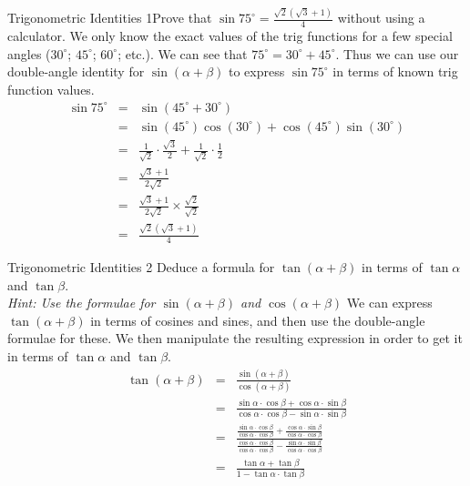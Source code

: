 \begin{wex}{Trigonometric Identities 1}{Prove that $\sin 75^\circ=\frac{\sqrt{2}(\sqrt{3}+1)}{4}$ without using a calculator.}
{
We only know the exact values of the trig functions for a few special angles ($30^\circ$; $45^\circ$; $60^\circ$; etc.). We can see that $75^\circ=30^\circ+45^\circ$. Thus we can use our double-angle identity for $\sin(\alpha+\beta)$ to express $\sin 75^\circ$ in terms of known trig function values.
\begin{eqnarray*}
\sin 75^\circ&=&\sin(45^\circ+30^\circ)\\
&=&\sin(45^\circ)\cos(30^\circ)+\cos(45^\circ)\sin(30^\circ)\\
&=&\frac{1}{\sqrt{2}}\cdot\frac{\sqrt{3}}{2}+\frac{1}{\sqrt{2}}\cdot\frac{1}{2}\\\
&=&\frac{\sqrt{3}+1}{2\sqrt{2}}\\
&=&\frac{\sqrt{3}+1}{2\sqrt{2}}\times\frac{\sqrt{2}}{\sqrt{2}}\\
&=&\frac{\sqrt{2}(\sqrt{3}+1)}{4}
\end{eqnarray*}
}
\end{wex}

\begin{wex}{Trigonometric Identities 2}
{Deduce a formula for $\tan(\alpha+\beta)$ in terms of $\tan\alpha$ and $\tan\beta$.\\
\emph{Hint: Use the formulae for $\sin(\alpha+\beta)$ and $\cos(\alpha+\beta)$} }
{
We can express $\tan(\alpha+\beta)$ in terms of cosines and sines, and then use the double-angle formulae for these. We then manipulate the resulting expression in order to get it in terms of $\tan\alpha$ and $\tan\beta$.
\westep{Execute strategy}
\begin{eqnarray*}
\tan(\alpha+\beta)&=&\frac{\sin(\alpha+\beta)}{\cos(\alpha+\beta)}\\
&=&\frac{\sin\alpha\cdot\cos\beta+\cos\alpha\cdot\sin\beta}{\cos\alpha\cdot\cos\beta-\sin\alpha\cdot\sin\beta}\\
&=&\frac{\frac{\sin\alpha\cdot\cos\beta}{\cos\alpha\cdot\cos\beta}+\frac{\cos\alpha\cdot\sin\beta}{\cos\alpha\cdot\cos\beta}}{\frac{\cos\alpha\cdot\cos\beta}{\cos\alpha\cdot\cos\beta}-\frac{\sin\alpha\cdot\sin\beta}{\cos\alpha\cdot\cos\beta}}\\
&=& \frac{\tan\alpha+\tan\beta}{1-\tan\alpha\cdot\tan\beta}
\end{eqnarray*}
}
\end{wex}

